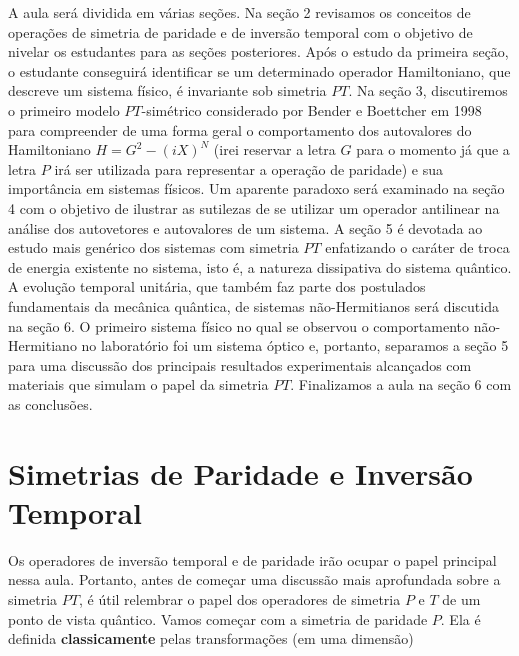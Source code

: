 \documentclass{article}
\begin{document}
A aula será dividida em várias seções. Na seção 2 revisamos os conceitos de operações de simetria de paridade e de inversão temporal com o objetivo de nivelar os estudantes para as seções posteriores. Após o estudo da primeira seção, o estudante conseguirá identificar se um determinado operador Hamiltoniano, que descreve um sistema físico, é invariante sob simetria $PT$. Na seção 3, discutiremos o primeiro modelo $PT$-simétrico considerado por Bender e Boettcher em 1998 para compreender de uma forma geral o comportamento dos autovalores do Hamiltoniano $H = G^2 - (iX)^N$ (irei reservar a letra $G$ para o momento já que a letra $P$ irá ser utilizada para representar a operação de paridade) e sua importância em sistemas físicos. Um aparente paradoxo será examinado na seção 4 com o objetivo de ilustrar as sutilezas de se utilizar um operador antilinear na análise dos autovetores e autovalores de um sistema. A seção 5 é devotada ao estudo mais genérico dos sistemas com simetria $PT$ enfatizando o caráter de troca de energia existente no sistema, isto é, a natureza dissipativa do sistema quântico. A evolução temporal unitária, que também faz parte dos postulados fundamentais da mecânica quântica, de sistemas não-Hermitianos será discutida na seção 6. O primeiro sistema físico no qual se observou o comportamento não-Hermitiano no laboratório foi um sistema óptico e, portanto, separamos a seção 5 para uma discussão dos principais resultados experimentais alcançados com materiais que simulam o papel da simetria $PT$. Finalizamos a aula na seção 6 com as conclusões.


\section{Simetrias de Paridade e Inversão Temporal}

Os operadores de inversão temporal e de paridade irão ocupar o papel principal nessa aula. Portanto, antes de começar uma discussão mais aprofundada sobre a simetria $PT$, é útil relembrar o papel dos operadores de simetria $P$ e $T$ de um ponto de vista quântico. Vamos começar com a simetria de paridade $P$. Ela é definida \textbf{classicamente} pelas transformações (em uma dimensão)
\end{document}
